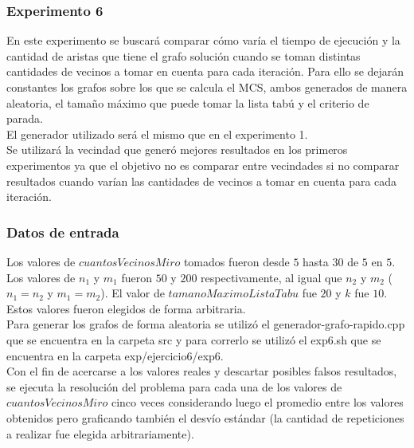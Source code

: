 \subsubsection*{Experimento 6}\;
\noindent En este experimento se buscará comparar cómo varía el tiempo de ejecución y la cantidad de aristas que tiene el grafo solución cuando se toman distintas cantidades de vecinos a tomar en cuenta para cada iteración. Para ello se dejarán constantes los grafos sobre los que se calcula el MCS, ambos generados de manera aleatoria, el tamaño máximo que puede tomar la lista tabú y el criterio de parada.\\
El generador utilizado será el mismo que en el experimento 1.\\
Se utilizará la vecindad que generó mejores resultados en los primeros experimentos ya que el objetivo no es comparar entre vecindades si no comparar resultados cuando varían las cantidades de vecinos a tomar en cuenta para cada iteración.

\subsubsection*{Datos de entrada}\;
\noindent Los valores de $cuantosVecinosMiro$ tomados fueron desde $5$ hasta $30$ de $5$ en $5$. \\
       Los valores de $n_1$ y $m_1$ fueron $50$ y $200$ respectivamente, al igual que $n_2$ y $m_2$ ($n_1 = n_2$ y $m_1 = m_2$). El valor de $tamanoMaximoListaTabu$ fue $20$ y $k$ fue $10$. Estos valores fueron elegidos de forma arbitraria. \\
        Para generar los grafos de forma aleatoria se utilizó el generador-grafo-rapido.cpp que se encuentra en la carpeta src y para correrlo se utilizó el exp6.sh que se encuentra en la carpeta exp/ejercicio6/exp6. \\
        Con el fin de acercarse a los valores reales y descartar posibles falsos resultados, se ejecuta la resolución del problema para cada una de los valores de $cuantosVecinosMiro$ cinco veces considerando luego el promedio entre los valores obtenidos pero graficando también el desvío estándar (la cantidad de repeticiones a realizar fue elegida arbitrariamente).\; 
        
